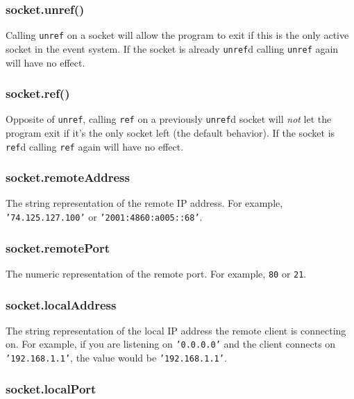 \subsubsection{socket.unref()}\label{socket.unref}

Calling \texttt{unref} on a socket will allow the program to exit if
this is the only active socket in the event system. If the socket is
already \texttt{unref}d calling \texttt{unref} again will have no
effect.

\subsubsection{socket.ref()}\label{socket.ref}

Opposite of \texttt{unref}, calling \texttt{ref} on a previously
\texttt{unref}d socket will \emph{not} let the program exit if it's the
only socket left (the default behavior). If the socket is \texttt{ref}d
calling \texttt{ref} again will have no effect.

\subsubsection{socket.remoteAddress}\label{socket.remoteaddress}

The string representation of the remote IP address. For example,
\texttt{'74.125.127.100'} or \texttt{'2001:4860:a005::68'}.

\subsubsection{socket.remotePort}\label{socket.remoteport}

The numeric representation of the remote port. For example, \texttt{80}
or \texttt{21}.

\subsubsection{socket.localAddress}\label{socket.localaddress}

The string representation of the local IP address the remote client is
connecting on. For example, if you are listening on \texttt{'0.0.0.0'}
and the client connects on \texttt{'192.168.1.1'}, the value would be
\texttt{'192.168.1.1'}.

\subsubsection{socket.localPort}\label{socket.localport}

